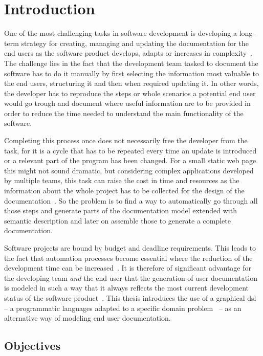 \chapter{Introduction}\label{ch:intro}

One of the most challenging tasks in software development is developing a long-term strategy for creating, managing and updating the documentation for the end users as the software product develops, adapts or increases in complexity~\cite{ieee6081814}. The challenge lies in the fact that the development team tasked to document the software has to do it manually by first selecting the information most valuable to the end users, structuring it and then when required updating it. In other words, the developer has to reproduce the steps or whole scenarios a potential end user would go trough and document where useful information are to be provided in order to reduce the time needed to understand the main functionality of the software. 

Completing this process once does not necessarily free the developer from the task, for it is a cycle that has to be repeated every time an update is introduced or a relevant part of the program has been changed. For a small static web page this might not sound dramatic, but considering complex applications developed by multiple teams, this task can raise the cost in time and resources as the information about the whole project has to be collected for the design of the documentation~\cite{ieee5712775}. So the problem is to find a way to automatically go through all those steps and generate parts of the documentation model extended with semantic description and later on assemble those to generate a complete documentation.

Software projects are bound by budget and deadline requirements. This leads to the fact that automation processes become essential where the reduction of the development time can be increased~\cite{despa2014comparative}. It is therefore of significant advantage for the developing team \textit{and} the end user that the generation of user documentation is modeled in such a way that it always reflects the most current development status of the software product~\cite{waits_et_al}. This thesis introduces the use of a graphical \gls{dsl} -- a programmatic languages adapted to a specific domain problem~\cite{perez-et_al} -- as an alternative way of modeling end user documentation.

\section{Objectives}\label{sec:objectives}

